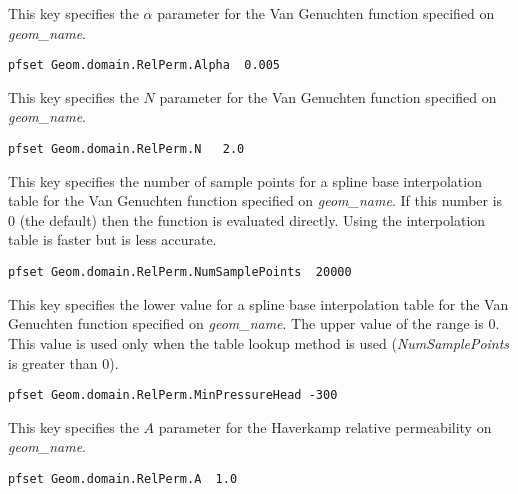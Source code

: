 {This key specifies the $\alpha$ parameter for the Van Genuchten function
specified on {\em geom\_name}.
}
\begin{display}\begin{verbatim}
pfset Geom.domain.RelPerm.Alpha  0.005
\end{verbatim}\end{display}


{This key specifies the $N$ parameter for the Van Genuchten function specified
on {\em geom\_name}.
}
\begin{display}\begin{verbatim}
pfset Geom.domain.RelPerm.N   2.0
\end{verbatim}\end{display}

{This key specifies the number of sample points for a spline base interpolation table
for the Van Genuchten function specified on {\em geom\_name}.   If this number is 0 (the default)
then the function is evaluated directly.   Using the interpolation table is faster but is less
accurate.
}
\begin{display}\begin{verbatim}
pfset Geom.domain.RelPerm.NumSamplePoints  20000
\end{verbatim}\end{display}

 {This key specifies the lower value for a spline base interpolation
 table for the Van Genuchten function specified on {\em geom\_name}.
  The upper value of the range is 0.  This value is used only when the
 table lookup method is used ({\em NumSamplePoints} is greater than 0).
  }
\begin{display}\begin{verbatim}
pfset Geom.domain.RelPerm.MinPressureHead -300
\end{verbatim}\end{display}

{This key specifies the $A$ parameter for the Haverkamp relative permeability
on {\em geom\_name}.
}
\begin{display}\begin{verbatim}
pfset Geom.domain.RelPerm.A  1.0
\end{verbatim}\end{display}

